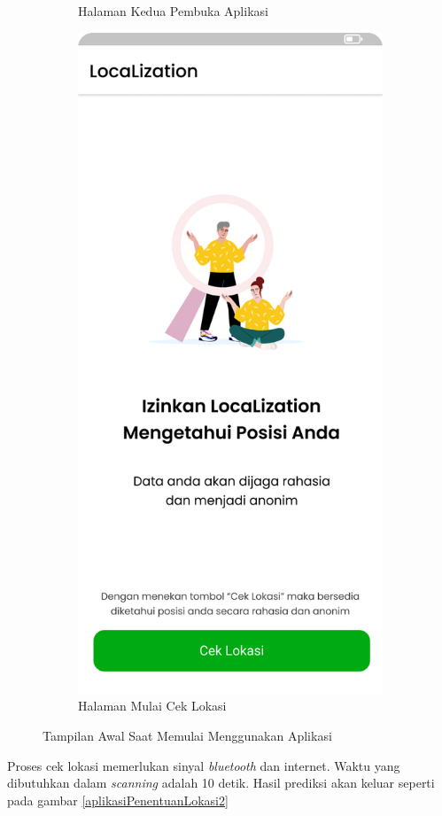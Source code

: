 \begin{enumerate}[a.]
\begin{figure} [H]
\begin{subfigure}{.5\textwidth}
			      \caption{Halaman Kedua Pembuka Aplikasi}
		      \end{subfigure}
		      \vspace{1cm}
		      \newline
		      \begin{center}
			      \begin{subfigure}{.5\textwidth}
				      \centering
				      \includegraphics[width=.5\linewidth]{gambar/mulai (1).png}
				      \caption{Halaman Mulai Cek Lokasi}
			      \end{subfigure}
		      \end{center}
		      \vspace{0.5cm}
		      \caption{Tampilan Awal Saat Memulai Menggunakan Aplikasi}
		      \label{aplikasiPenentuanLokasi}
	      \end{figure}

	      \vspace{0.5cm}

	      \par Proses cek lokasi memerlukan sinyal \textit{bluetooth} dan internet. Waktu yang dibutuhkan dalam \textit{scanning} adalah 10 detik. Hasil prediksi akan keluar seperti pada gambar \ref*{aplikasiPenentuanLokasi2}


\end{enumerate}
